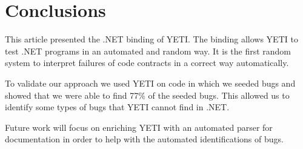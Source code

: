 \section{Conclusions}\label{sec:conc}
This article presented the .NET binding of YETI. The binding allows YETI to 
test .NET programs in an automated and random way. It is the first random system 
to interpret failures of code contracts in a correct way automatically.

To validate our approach we used YETI on code in which we seeded bugs and showed that
we were able to find 77\% of the seeded bugs. This allowed us to identify some types of bugs 
that YETI cannot find in .NET. 

Future work will focus on enriching YETI with an automated parser for documentation in order to help 
with the automated identifications of bugs.